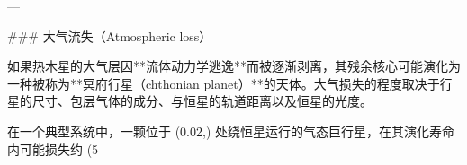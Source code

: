 ---

### 大气流失（Atmospheric loss）

如果热木星的大气层因**流体动力学逃逸**而被逐渐剥离，其残余核心可能演化为一种被称为**冥府行星（chthonian planet）**的天体。大气损失的程度取决于行星的尺寸、包层气体的成分、与恒星的轨道距离以及恒星的光度。

在一个典型系统中，一颗位于 (0.02,) 处绕恒星运行的气态巨行星，在其演化寿命内可能损失约 (5%
